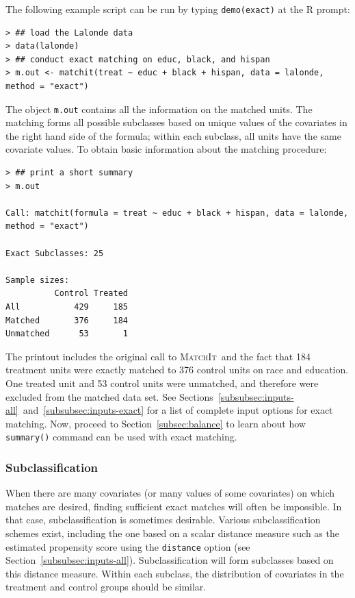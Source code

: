\documentclass[oneside,letterpaper,titlepage]{article}
\newcommand{\MatchIt}{\textsc{MatchIt}}
\begin{document}
The following example script can be run by typing {\tt demo(exact)} at
the R prompt:
\begin{verbatim}
> ## load the Lalonde data
> data(lalonde)
> ## conduct exact matching on educ, black, and hispan
> m.out <- matchit(treat ~ educ + black + hispan, data = lalonde, method = "exact")
\end{verbatim}
The object \texttt{m.out} contains all the information on the matched
units.  The matching forms all possible subclasses based on unique
values of the covariates in the right hand side of the formula; within
each subclass, all units have the same covariate values.  To obtain
basic information about the matching procedure:
\begin{verbatim}
> ## print a short summary
> m.out

Call: matchit(formula = treat ~ educ + black + hispan, data = lalonde, method = "exact")

Exact Subclasses: 25

Sample sizes:
          Control Treated
All           429     185
Matched       376     184
Unmatched      53       1
\end{verbatim}
The printout includes the original call to \MatchIt\ and the fact that
184 treatment units were exactly matched to 376 control units on race
and education. One treated unit and 53 control units were unmatched,
and therefore were excluded from the matched data set. See
Sections~\ref{subsubsec:inputs-all}~and~\ref{subsubsec:inputs-exact}
for a list of complete input options for exact matching.  Now, proceed
to Section~\ref{subsec:balance} to learn about how {\tt summary()}
command can be used with exact matching.

\subsubsection{Subclassification}
\label{subsubsec:subclass}

When there are many covariates (or many values of some covariates) on
which matches are desired, finding sufficient exact matches will often
be impossible.  In that case, subclassification is sometimes
desirable. Various subclassification schemes exist, including the one
based on a scalar distance measure such as the estimated propensity
score using the \texttt{distance} option (see
Section~\ref{subsubsec:inputs-all}).  Subclassification will form
subclasses based on this distance measure.  Within each subclass, the
distribution of covariates in the treatment and control groups should
be similar.
\end{document}
